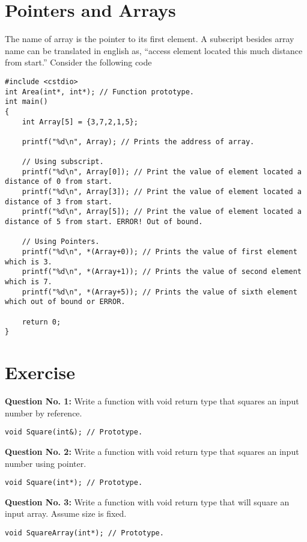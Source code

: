 \documentclass{article}
\begin{document}
\section{Pointers and Arrays}
The name of array is the pointer to its first element. A subscript besides array name can be translated in english as, ``access element located this much distance from start.'' Consider the following code
\begin{lstlisting}[caption={Arrays and Pointers}]
#include <cstdio>
int Area(int*, int*); // Function prototype.
int main()
{
	int Array[5] = {3,7,2,1,5};

	printf("%d\n", Array); // Prints the address of array.

	// Using subscript.
	printf("%d\n", Array[0]); // Print the value of element located a distance of 0 from start.
	printf("%d\n", Array[3]); // Print the value of element located a distance of 3 from start.
	printf("%d\n", Array[5]); // Print the value of element located a distance of 5 from start. ERROR! Out of bound.

	// Using Pointers.
	printf("%d\n", *(Array+0)); // Prints the value of first element which is 3.
	printf("%d\n", *(Array+1)); // Prints the value of second element which is 7.
	printf("%d\n", *(Array+5)); // Prints the value of sixth element which out of bound or ERROR.

	return 0;
}
\end{lstlisting}
\newpage
\section{Exercise}
\textbf{Question No. 1:} Write a function with void return type that squares an input number by reference.
\begin{lstlisting}[caption={Square by reference}]
void Square(int&); // Prototype.
\end{lstlisting}
\textbf{Question No. 2:} Write a function with void return type that squares an input number using pointer.
\begin{lstlisting}[caption={Square using pointer}]
void Square(int*); // Prototype.
\end{lstlisting}
\textbf{Question No. 3:} Write a function with void return type that will square an input array. Assume size is fixed.
\begin{lstlisting}[caption={Square using array pointer}]
void SquareArray(int*); // Prototype.
\end{lstlisting}
\end{document}
